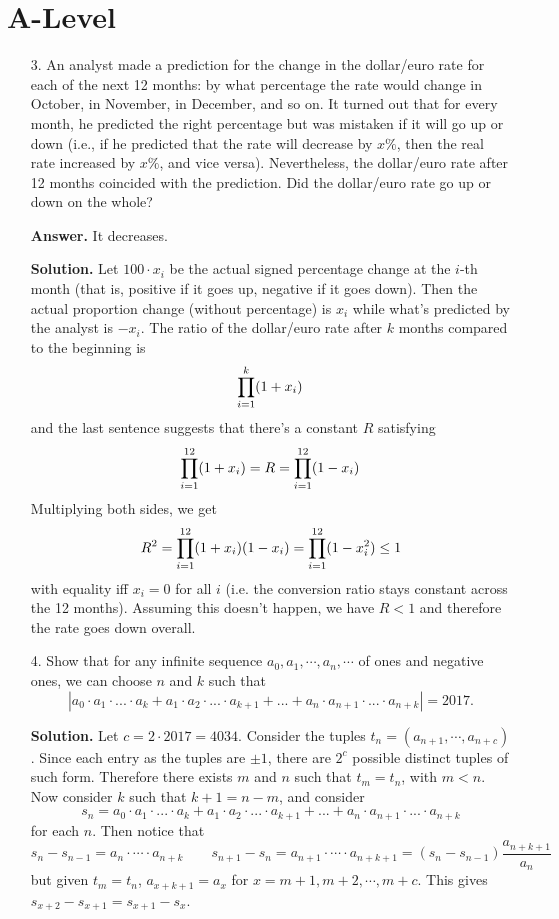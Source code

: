 \documentclass[11pt,a4paper]{article}
\begin{document}
\section*{A-Level}
\begin{enumerate}
	\item [3.] An analyst made a prediction for the change in the dollar/euro rate for each of the next 12 months: by what percentage the rate would change in October, in November, in December, and so on. It turned out that for every month, he predicted the right percentage but was mistaken if it will go up or down (i.e., if he predicted that the rate will decrease by $x\%$, then the real rate increased by $x\%$, and vice versa). Nevertheless, the dollar/euro rate after 12 months coincided with the prediction. Did the dollar/euro rate go up or down on the whole?
	
	\textbf{Answer.} It decreases.
	
	\textbf{Solution.} Let $100\cdot x_i$ be the actual signed percentage change at the $i$-th month (that is, positive if it goes up, negative if it goes down). Then the actual proportion change (without percentage) is $x_i$ while what's predicted by the analyst is $-x_i$. The ratio of the dollar/euro rate after $k$ months compared to the beginning is 
	\[
	\displaystyle\prod_{i=1}^k (1+x_i)
	\]
	and the last sentence suggests that there's a constant $R$ satisfying 
	\[
	\displaystyle\prod_{i=1}^{12} (1+x_i) = R = \displaystyle\prod_{i=1}^{12} (1-x_i)
	\]
	Multiplying both sides, we get 
	\[
	R^2 = \displaystyle\prod_{i=1}^{12} (1+x_i) (1-x_i) = \displaystyle\prod_{i=1}^{12} (1-x_i^2)\le 1
	\]
	with equality iff $x_i=0$ for all $i$ (i.e. the conversion ratio stays constant across the 12 months). Assuming this doesn't happen, we have $R<1$ and therefore the rate goes down overall. 
	
	\item [4.] Show that for any infinite sequence $a_0, a_1, \cdots , a_n, \cdots$ of ones and negative ones, we can choose $n$ and $k$ such that
	\[
	|a_0 \cdot a_1 \cdot ...\cdot a_k + a_1 \cdot a_2 \cdot...\cdot a_{k+1} +...+a_n \cdot a_{n+1} \cdot...\cdot a_{n+k}|=2017.
	\]
	
	\textbf{Solution.} 
	Let $c=2\cdot 2017=4034$. 
	Consider the tuples $t_n = (a_{n+1}, \cdots , a_{n+c})$. Since each entry as the tuples are $\pm 1$, there are $2^{c}$ possible distinct tuples of such form. Therefore there exists $m$ and $n$ such that $t_m=t_n$, with $m< n$. Now consider $k$ such that $k+1=n-m$, and consider 
	\[
	s_n = a_0 \cdot a_1 \cdot ...\cdot a_k + a_1 \cdot a_2 \cdot...\cdot a_{k+1} +...+a_n \cdot a_{n+1} \cdot...\cdot a_{n+k}
	\]
	for each $n$. Then notice that 
	\[
	s_{n}-s_{n-1} = a_n\cdot \cdots \cdot a_{n+k}\qquad
	s_{n+1}-s_n = a_{n+1}\cdot \cdots \cdot a_{n+k+1} = (s_{n}-s_{n-1})\frac{a_{n+k+1}}{a_{n}}
	\]
	but given $t_m=t_n$, $a_{x+k+1}=a_x$ for $x=m+1, m+2, \cdots , m+c$. This gives $s_{x+2}-s_{x+1}=s_{x+1}-s_x$. 
	

\end{enumerate}
\end{document}
